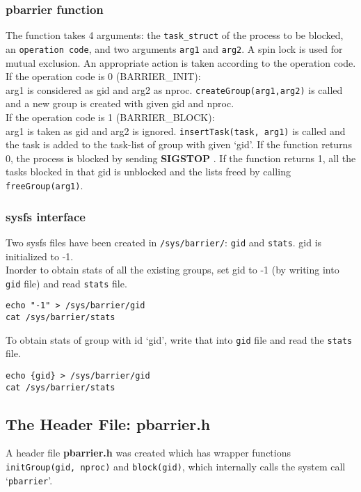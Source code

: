\subsubsection{pbarrier function}
The function takes 4 arguments: the \texttt{task\_struct} of the process to be blocked, an \texttt{operation code}, and two arguments \texttt{arg1} and \texttt{arg2}. A spin lock is used for mutual exclusion. An appropriate action is taken according to the operation code. \\
If the operation code is 0 (BARRIER\_INIT): \\
arg1 is considered as gid and arg2 as nproc. \texttt{createGroup(arg1,arg2)} is called and a new group is created with given gid and nproc.\\
If the operation code is 1 (BARRIER\_BLOCK):\\
arg1 is taken as gid and arg2 is ignored. \texttt{insertTask(task, arg1)} is called and the task is added to the task-list of group with given `gid'. If the function returns 0, the process is blocked by sending \textbf{SIGSTOP} . If the function returns 1, all the tasks blocked in that gid is unblocked and the lists freed by calling \texttt{freeGroup(arg1)}.

\subsubsection{sysfs interface}
Two sysfs files have been created in \texttt{/sys/barrier/}: \texttt{gid} and \texttt{stats}. gid is initialized to -1.\\
Inorder to obtain stats of all the existing groups, set gid to -1 (by writing into \texttt{gid} file) and read \texttt{stats} file.
\begin{verbatim}
echo "-1" > /sys/barrier/gid
cat /sys/barrier/stats
\end{verbatim}
To obtain stats of group with id `gid', write that into \texttt{gid} file and read the \texttt{stats} file.
\begin{verbatim}
echo {gid} > /sys/barrier/gid
cat /sys/barrier/stats
\end{verbatim}

\subsection{The Header File: pbarrier.h} %
A header file \textbf{pbarrier.h} was created which has wrapper functions \texttt{initGroup(gid, nproc)} and \texttt{block(gid)}, which internally calls the system call `\texttt{pbarrier}'.

